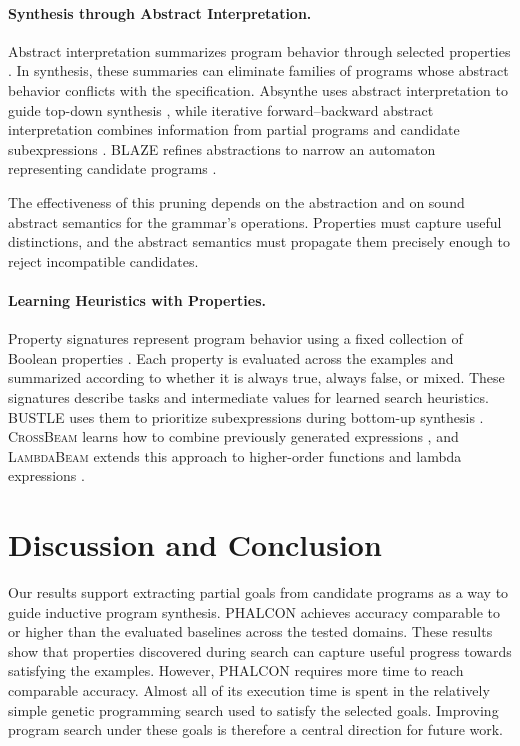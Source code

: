 \documentclass[letterpaper]{article} %
\begin{document}
\paragraph{Synthesis through Abstract Interpretation.}
Abstract interpretation summarizes program behavior through selected
properties \citep{cousot1977abstract}. In synthesis, these summaries can
eliminate families of programs whose abstract behavior conflicts with
the specification. Absynthe uses abstract interpretation to guide
top-down synthesis \citep{guria2023absynthe}, while iterative
forward--backward abstract interpretation combines information from
partial programs and candidate subexpressions \citep{yoon2023inductive}.
BLAZE refines abstractions to narrow an automaton representing candidate
programs \citep{wang2018abstraction}.

The effectiveness of this pruning depends on the abstraction and on
sound abstract semantics for the grammar's operations. Properties must
capture useful distinctions, and the abstract semantics must propagate
them precisely enough to reject incompatible candidates.

\paragraph{Learning Heuristics with Properties.}
Property signatures represent program behavior using a fixed collection
of Boolean properties \citep{odena2020signatures}. Each property is
evaluated across the examples and summarized according to whether it is
always true, always false, or mixed. These signatures describe tasks and
intermediate values for learned search heuristics. BUSTLE uses them to
prioritize subexpressions during bottom-up synthesis
\citep{odena2021bustle}. \textsc{CrossBeam} learns how to combine previously
generated expressions \citep{shi2022crossbeam}, and \textsc{LambdaBeam} extends
this approach to higher-order functions and lambda expressions
\citep{shi2023lambdabeam}.

\section{Discussion and Conclusion}
Our results support extracting partial goals from candidate programs as
a way to guide inductive program synthesis. PHALCON achieves accuracy
comparable to or higher than the evaluated baselines across the tested
domains. These results show that properties discovered during search
can capture useful progress towards satisfying the examples. However,
PHALCON requires more time to reach comparable accuracy. Almost all of
its execution time is spent in the relatively simple genetic programming
search used to satisfy the selected goals. Improving program search
under these goals is therefore a central direction for future work.
\end{document}
